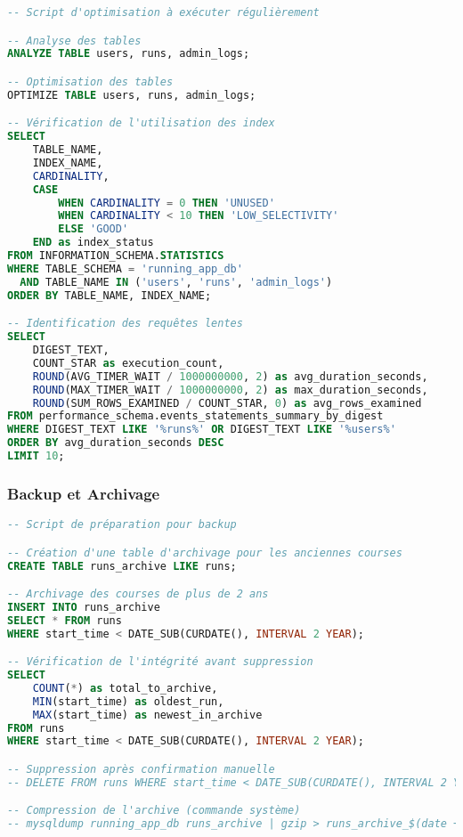\begin{lstlisting}[language=sql]
-- Script d'optimisation à exécuter régulièrement

-- Analyse des tables
ANALYZE TABLE users, runs, admin_logs;

-- Optimisation des tables
OPTIMIZE TABLE users, runs, admin_logs;

-- Vérification de l'utilisation des index
SELECT 
    TABLE_NAME,
    INDEX_NAME,
    CARDINALITY,
    CASE 
        WHEN CARDINALITY = 0 THEN 'UNUSED'
        WHEN CARDINALITY < 10 THEN 'LOW_SELECTIVITY'
        ELSE 'GOOD'
    END as index_status
FROM INFORMATION_SCHEMA.STATISTICS 
WHERE TABLE_SCHEMA = 'running_app_db'
  AND TABLE_NAME IN ('users', 'runs', 'admin_logs')
ORDER BY TABLE_NAME, INDEX_NAME;

-- Identification des requêtes lentes
SELECT 
    DIGEST_TEXT,
    COUNT_STAR as execution_count,
    ROUND(AVG_TIMER_WAIT / 1000000000, 2) as avg_duration_seconds,
    ROUND(MAX_TIMER_WAIT / 1000000000, 2) as max_duration_seconds,
    ROUND(SUM_ROWS_EXAMINED / COUNT_STAR, 0) as avg_rows_examined
FROM performance_schema.events_statements_summary_by_digest
WHERE DIGEST_TEXT LIKE '%runs%' OR DIGEST_TEXT LIKE '%users%'
ORDER BY avg_duration_seconds DESC
LIMIT 10;
\end{lstlisting}

\subsubsection{Backup et Archivage}

\begin{lstlisting}[language=sql]
-- Script de préparation pour backup

-- Création d'une table d'archivage pour les anciennes courses
CREATE TABLE runs_archive LIKE runs;

-- Archivage des courses de plus de 2 ans
INSERT INTO runs_archive 
SELECT * FROM runs 
WHERE start_time < DATE_SUB(CURDATE(), INTERVAL 2 YEAR);

-- Vérification de l'intégrité avant suppression
SELECT 
    COUNT(*) as total_to_archive,
    MIN(start_time) as oldest_run,
    MAX(start_time) as newest_in_archive
FROM runs 
WHERE start_time < DATE_SUB(CURDATE(), INTERVAL 2 YEAR);

-- Suppression après confirmation manuelle
-- DELETE FROM runs WHERE start_time < DATE_SUB(CURDATE(), INTERVAL 2 YEAR);

-- Compression de l'archive (commande système)
-- mysqldump running_app_db runs_archive | gzip > runs_archive_$(date +%Y%m%d).sql.gz
\end{lstlisting}